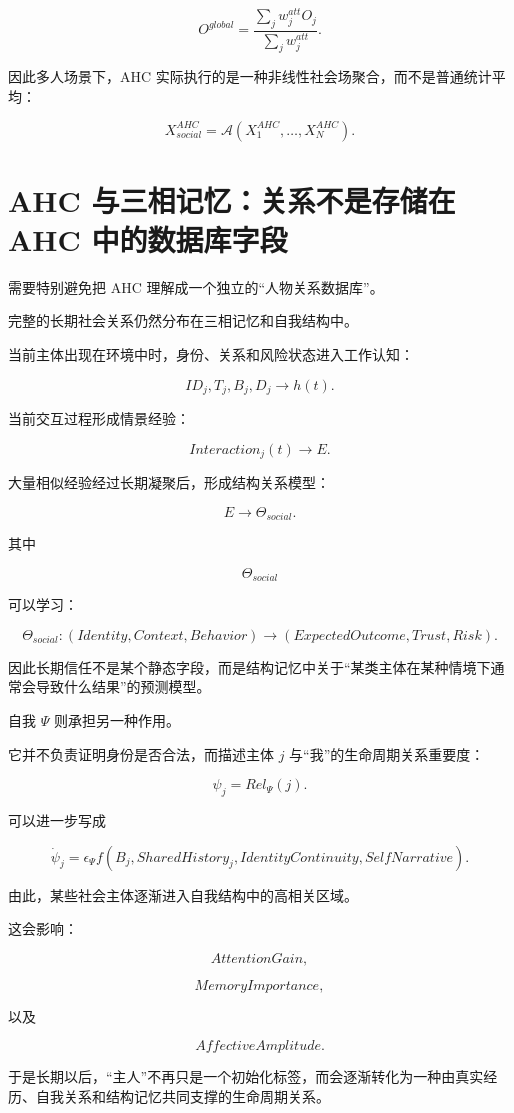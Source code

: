 \[
O^{global}
=
\frac{
\sum_j
w_j^{att}O_j
}{
\sum_jw_j^{att}
}.
\]

因此多人场景下，AHC 实际执行的是一种非线性社会场聚合，而不是普通统计平均：

\[
\boxed{
X_{social}^{AHC}
=
\mathcal A
(
X_1^{AHC},
\ldots,
X_N^{AHC}
).
}
\]


\section{AHC 与三相记忆：关系不是存储在 AHC 中的数据库字段}

需要特别避免把 AHC 理解成一个独立的“人物关系数据库”。

完整的长期社会关系仍然分布在三相记忆和自我结构中。

当前主体出现在环境中时，身份、关系和风险状态进入工作认知：

\[
ID_j,
T_j,
B_j,
D_j
\rightarrow
h(t).
\]

当前交互过程形成情景经验：

\[
Interaction_j(t)
\rightarrow
E.
\]

大量相似经验经过长期凝聚后，形成结构关系模型：

\[
E
\rightarrow
\Theta_{social}.
\]

其中

\[
\Theta_{social}
\]

可以学习：

\[
\Theta_{social}
:
(
Identity,
Context,
Behavior
)
\rightarrow
(
ExpectedOutcome,
Trust,
Risk
).
\]

因此长期信任不是某个静态字段，而是结构记忆中关于“某类主体在某种情境下通常会导致什么结果”的预测模型。

自我 $\Psi$ 则承担另一种作用。

它并不负责证明身份是否合法，而描述主体 $j$ 与“我”的生命周期关系重要度：

\[
\psi_j
=
Rel_\Psi(j).
\]

可以进一步写成

\[
\dot\psi_j
=
\epsilon_\Psi
f
\left(
B_j,
SharedHistory_j,
IdentityContinuity,
SelfNarrative
\right).
\]

由此，某些社会主体逐渐进入自我结构中的高相关区域。

这会影响：

\[
AttentionGain,
\]

\[
MemoryImportance,
\]

以及

\[
AffectiveAmplitude.
\]

于是长期以后，“主人”不再只是一个初始化标签，而会逐渐转化为一种由真实经历、自我关系和结构记忆共同支撑的生命周期关系。


